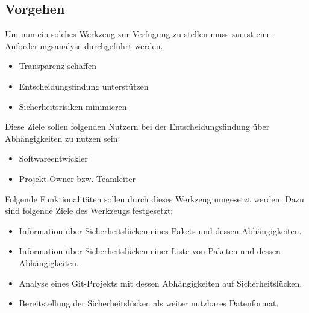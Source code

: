 \subsection{Vorgehen} \label{subsec:Vorgehen}
Um nun ein solches Werkzeug zur Verfügung zu stellen muss zuerst eine Anforderungsanalyse durchgeführt werden.
\begin{itemize}
    \item Transparenz schaffen
    \item Entscheidungsfindung unterstützen
    \item Sicherheitsrisiken minimieren
\end{itemize}
Diese Ziele sollen folgenden Nutzern bei der Entscheidungsfindung über Abhängigkeiten zu nutzen sein:
\begin{itemize}
    \item Softwareentwickler
    \item Projekt-Owner bzw. Teamleiter
\end{itemize}
Folgende Funktionalitäten sollen durch dieses Werkzeug umgesetzt werden:
Dazu sind folgende Ziele des Werkzeugs festgesetzt:
\begin{itemize}
    \item Information über Sicherheitslücken eines Pakets und dessen Abhängigkeiten.
    \item Information über Sicherheitslücken einer Liste von Paketen und dessen Abhängigkeiten.
    \item Analyse eines Git-Projekts mit dessen Abhängigkeiten auf Sicherheitslücken.
    \item Bereitstellung der Sicherheitslücken als weiter nutzbares Datenformat.
\end{itemize}